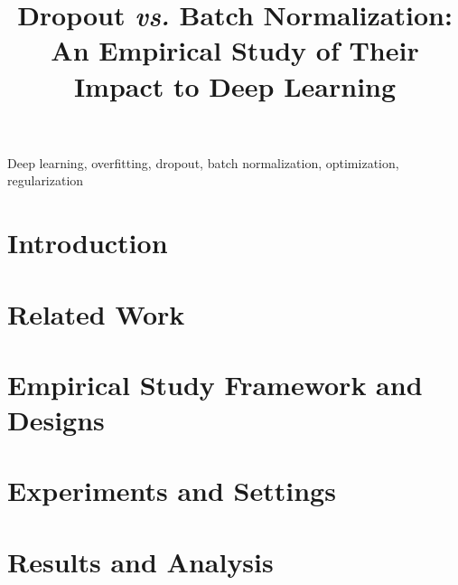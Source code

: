 \documentclass[conference]{IEEEtran}
\begin{document}
\title{Dropout \textit{vs.} Batch Normalization: An Empirical Study of Their Impact to Deep Learning}

\author{
}

\maketitle

\begin{abstract}

\end{abstract}

\begin{IEEEkeywords}
Deep learning, overfitting, dropout, batch normalization, optimization, regularization
\end{IEEEkeywords}

\section{Introduction}


\section{Related Work}


\section{Empirical Study Framework and Designs}


\section{Experiments and Settings}\label{sec:experiments}


\section{Results and Analysis}\label{sec:results}

\end{document}
